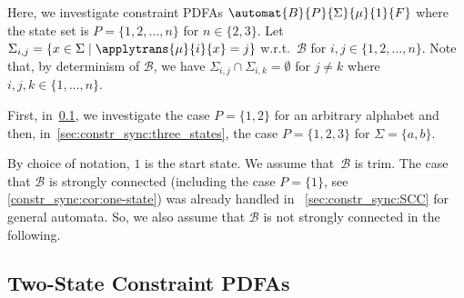 
\label{def:Sigmaij}
Here, we investigate constraint PDFAs $\automat{B}{P}{\Sigma}{\mu}{1}{F}$
where the state set is $P = \{1,2,\ldots,n\}$ for $n \in \{2,3\}$.
Let
$\Sigma_{i,j} = \{ x \in \Sigma \mid \applytrans{\mu}{i}{x} = j \}$
w.r.t.~$\mathcal B$ for $i,j \in \{1,2,\ldots,n\}$.
Note that, by determinism of $\mathcal B$,
we have $\Sigma_{i,j} \cap \Sigma_{i,k} = \emptyset$
for $j \ne k$ where $i,j,k \in \{1,\ldots,n\}$.

First, in~\cref{constr_sync:sec:two-state}, we investigate the case $P = \{1,2\}$ for an arbitrary alphabet
and then, in~\cref{sec:constr_sync:three_states}, the case $P = \{1,2,3\}$ for $\Sigma= \{a,b\}$.

By choice of notation, $1$ is the start state.
We assume that~$\mathcal B$ is trim.
The case that $\mathcal B$ is strongly connected (including the case $P = \{1\}$, see \cref{constr_sync:cor:one-state})
was already handled in \SEC~\ref{sec:constr_sync:SCC} for general automata.
So, we also assume that $\mathcal B$ is not strongly connected
in the following. 

\subsection{Two-State Constraint PDFAs}
\label{constr_sync:sec:two-state}

